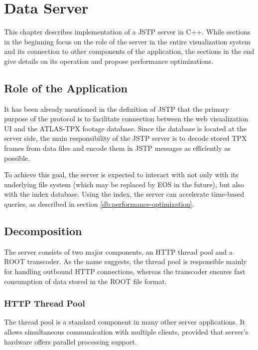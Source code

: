 \chapter{Data Server}
This chapter describes implementation of a JSTP server in C++. While sections in the beginning focus on the role of the server in the entire visualization system and its connection to other components of the application, the sections in the end give details on its operation and propose performance optimizations.

\section{Role of the Application}
It has been already mentioned in the definition of JSTP that the primary purpose of the protocol is to facilitate connection between the web visualization UI and the ATLAS-TPX footage database. Since the database is located at the server side, the main responsibility of the JSTP server is to decode stored TPX frames from data files and encode them in JSTP messages as efficiently as possible.

To achieve this goal, the server is expected to interact with not only with its underlying file system (which may be replaced by EOS in the future), but also with the index database. Using the index, the server can accelerate time-based queries, as described in section \ref{db:performance-optimization}.

\todo

\section{Decomposition}
The server consists of two major components, an HTTP thread pool and a ROOT transcoder. As the name suggests, the thread pool is responsible mainly for handling outbound HTTP connections, whereas the transcoder ensures fast consumption of data stored in the ROOT file format.

\subsection{HTTP Thread Pool}
The thread pool is a standard component in many other server applications. It allows simultaneous communication with multiple clients, provided that server's hardware offers parallel processing support.

